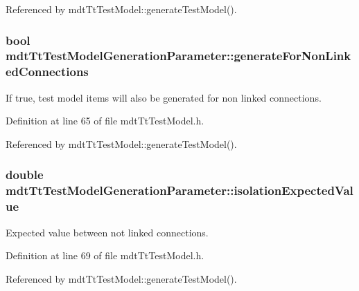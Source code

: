 Referenced by mdt\-Tt\-Test\-Model\-::generate\-Test\-Model().

\hypertarget{structmdt_tt_test_model_generation_parameter_acfd7fa91840f9e8092a25f9c41ce751d}{
\subsubsection[{generate\-For\-Non\-Linked\-Connections}]{\setlength{\rightskip}{0pt plus 5cm}bool mdt\-Tt\-Test\-Model\-Generation\-Parameter\-::generate\-For\-Non\-Linked\-Connections}}\label{structmdt_tt_test_model_generation_parameter_acfd7fa91840f9e8092a25f9c41ce751d}


If true, test model items will also be generated for non linked connections. 



Definition at line 65 of file mdt\-Tt\-Test\-Model.\-h.



Referenced by mdt\-Tt\-Test\-Model\-::generate\-Test\-Model().

\hypertarget{structmdt_tt_test_model_generation_parameter_aef12a7b98660799b54525a8e39263686}{
\subsubsection[{isolation\-Expected\-Value}]{\setlength{\rightskip}{0pt plus 5cm}double mdt\-Tt\-Test\-Model\-Generation\-Parameter\-::isolation\-Expected\-Value}}\label{structmdt_tt_test_model_generation_parameter_aef12a7b98660799b54525a8e39263686}


Expected value between not linked connections. 



Definition at line 69 of file mdt\-Tt\-Test\-Model.\-h.



Referenced by mdt\-Tt\-Test\-Model\-::generate\-Test\-Model().

